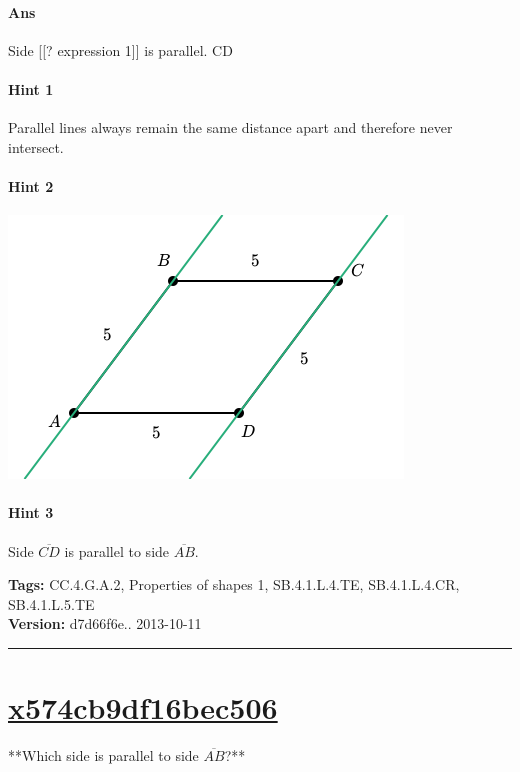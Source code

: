\documentclass[twocolumn,10pt]{article}
\def\shrinkfactor{0.55}
\begin{document}
\paragraph{Ans} Side  [[? expression 1]] is parallel.
  CD

\paragraph{Hint 1}Parallel lines always remain the same distance apart and therefore never intersect. 

\paragraph{Hint 2}
\includegraphics[scale=\shrinkfactor]{figures/5171a6475c1016e0d75473bd038031d9f41676df.png}

\paragraph{Hint 3}Side $\overline{CD}$ is parallel to side $\overline{AB}$.



\medskip
\noindent
\textbf{Tags:} {\footnotesize CC.4.G.A.2, Properties of shapes 1, SB.4.1.L.4.TE, SB.4.1.L.4.CR, SB.4.1.L.5.TE}\\
\textbf{Version:} d7d66f6e.. 2013-10-11
\smallskip\hrule





\section{\href{https://www.khanacademy.org/devadmin/content/items/x574cb9df16bec506}{x574cb9df16bec506}}

\noindent
**Which side is parallel to side $\overline{AB}$?**
\end{document}
